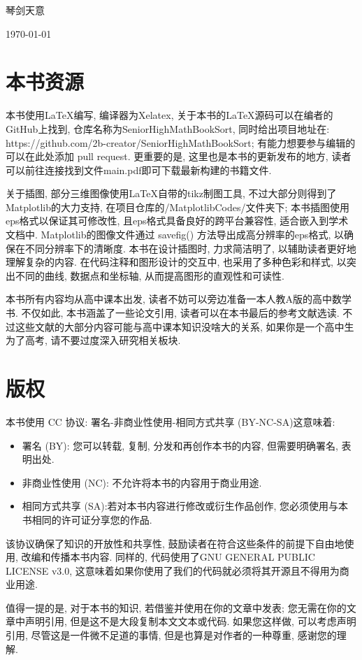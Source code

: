 \documentclass{book}
\begin{document}
{\hfill 琴剑天意}

{\hfill \today}

\section{本书资源}
本书使用\LaTeX 编写, 编译器为Xelatex, 关于本书的\LaTeX 源码可以在编者的GitHub上找到, 仓库名称为SeniorHighMathBookSort, 同时给出项目地址在: \\https://github.com/2b-creator/SeniorHighMathBookSort; 有能力想要参与编辑的可以在此处添加 pull request. 更重要的是, 这里也是本书的更新发布的地方, 读者可以前往连接找到文件main.pdf即可下载最新构建的书籍文件.

关于插图, 部分三维图像使用\LaTeX 自带的tikz制图工具, 不过大部分则得到了Matplotlib的大力支持, 在项目仓库的/MatplotlibCodes/文件夹下; 本书插图使用eps格式以保证其可修改性, 且eps格式具备良好的跨平台兼容性, 适合嵌入到学术文档中. Matplotlib的图像文件通过 savefig() 方法导出成高分辨率的eps格式, 以确保在不同分辨率下的清晰度. 本书在设计插图时, 力求简洁明了, 以辅助读者更好地理解复杂的内容. 在代码注释和图形设计的交互中, 也采用了多种色彩和样式, 以突出不同的曲线, 数据点和坐标轴, 从而提高图形的直观性和可读性.

本书所有内容均从高中课本出发, 读者不妨可以旁边准备一本人教A版的高中数学书. 不仅如此, 本书涵盖了一些论文引用, 读者可以在本书最后的参考文献选读. 不过这些文献的大部分内容可能与高中课本知识没啥大的关系, 如果你是一个高中生为了高考, 请不要过度深入研究相关板块.
\section{版权}
本书使用 CC 协议: 署名-非商业性使用-相同方式共享 (BY-NC-SA)\cite{cccommons}这意味着:
\begin{itemize}
    \item 署名 (BY): 您可以转载, 复制, 分发和再创作本书的内容, 但需要明确署名, 表明出处.
    \item 非商业性使用 (NC): 不允许将本书的内容用于商业用途.
    \item 相同方式共享 (SA):若对本书内容进行修改或衍生作品创作, 您必须使用与本书相同的许可证分享您的作品.
\end{itemize}

该协议确保了知识的开放性和共享性, 鼓励读者在符合这些条件的前提下自由地使用, 改编和传播本书内容. 同样的, 代码使用了GNU GENERAL PUBLIC LICENSE v3.0, 这意味着如果你使用了我们的代码就必须将其开源且不得用为商业用途.

值得一提的是, 对于本书的知识, 若借鉴并使用在你的文章中发表; 您无需在你的文章中声明引用, 但是这不是大段复制本文文本或代码. 如果您这样做, 可以考虑声明引用, 尽管这是一件微不足道的事情, 但是也算是对作者的一种尊重, 感谢您的理解.
\end{document}
